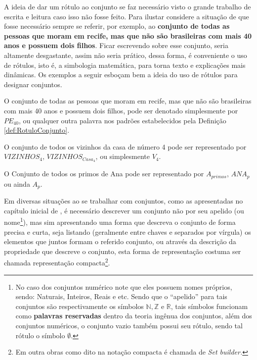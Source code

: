 A ideia de dar um rótulo ao conjunto se faz necessário visto o grande trabalho de escrita e leitura caso isso não fosse feito. Para ilustar considere a situação de que fosse necessário sempre se referir, por exemplo, ao \textbf{conjunto de todas as pessoas que moram em recife, mas que não são brasileiras com mais 40 anos e possuem dois filhos}. Ficar escrevendo sobre esse conjunto, seria altamente desgastante, assim não seria prático, dessa forma, é conveniente o uso de rótulos, isto é, a simbologia matemática, para torna texto e explicações mais dinâmicas. Os exemplos a seguir esboçam bem a ideia do uso de rótulos para designar conjuntos.

\begin{exemplo}\label{exe:RotuloConjunto1}
  O conjunto de todas as pessoas que moram em recife, mas que não são brasileiras com mais 40 anos e possuem dois filhos, pode ser denotado simplesmente por $PE_{40}$, ou qualquer outra palavra nos padrões estabelecidos pela Definição \ref{def:RotuloConjunto}.
\end{exemplo}

\begin{exemplo}\label{exe:RotuloConjunto2}
	O conjunto de todos os vizinhos da casa de número 4 pode ser representado por $VIZINHOS_4$, $VIZINHOS_{Casa_4}$, ou simplesmente  $V_4$.
\end{exemplo}

\begin{exemplo}\label{exe:RotuloConjunto3}
  O Conjunto de todos os primos de Ana pode ser representado por $A_{primos}$, $ANA_{p}$ ou ainda $A_p$.
\end{exemplo}

Em diversas situações ao se trabalhar com conjuntos, como as apresentadas no capítulo inicial de \cite{lipschutz1978-TC}, é necessário descrever um conjunto não por seu apelido (ou nome\footnote{No caso dos conjuntos numérico note que eles possuem nomes próprios, sendo: Naturais, Inteiros, Reais e etc. Sendo que o ``apelido'' para tais conjuntos são respectivamente os símbolos $\mathbb{N}, \mathbb{Z}$ e $\mathbb{R}$, tais símbolos funcionam como {\bf palavras reservadas} dentro da teoria ingênua dos conjuntos, além dos conjuntos numéricos, o conjunto vazio também possui seu rótulo, sendo tal rótulo o símbolo $\emptyset$.}), mas sim apresentando uma forma que descreva o conjunto de forma precisa e curta, seja listando (geralmente entre chaves e separados por vírgula) os elementos que juntos formam o referido conjunto, ou através da descrição da propriedade que descreve o conjunto, esta forma de representação costuma ser chamada representação compacta\footnote{Em outra obras como dito \cite{fmcbook} na notação compacta é chamada de \itshape{Set builder}.}.


